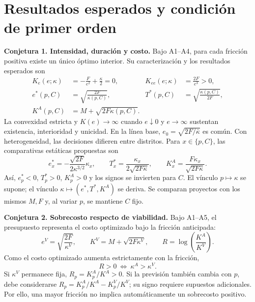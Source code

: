 \documentclass[11pt,a4paper]{article}
\begin{document}
\section{Resultados esperados y condición de primer orden}
\textbf{Conjetura 1. Intensidad, duración y costo.} Bajo A1--A4, para cada fricción positiva existe un único óptimo interior. Su caracterización y los resultados esperados son
\begin{align}
K_e(e;\kappa)&=-\frac{F}{e^2}+\frac{\kappa}{2}=0,
&K_{ee}(e;\kappa)&=\frac{2F}{e^3}>0,\label{eq:foc}\\
e^*(p,C)&=\sqrt{\frac{2F}{\kappa(p,C)}},
&T^*(p,C)&=\sqrt{\frac{\kappa(p,C)}{2F}},\label{eq:optimal}\\
K^A(p,C)&=M+\sqrt{2F\kappa(p,C)}.&&\label{eq:cost}
\end{align}
La convexidad estricta y $K(e)\to\infty$ cuando $e\downarrow0$ y $e\to\infty$ sustentan existencia, interioridad y unicidad. En la línea base, $e_0=\sqrt{2F/\bar\kappa}$ es común. Con heterogeneidad, las decisiones difieren entre distritos. Para $x\in\{p,C\}$, las comparativas estáticas propuestas son
\begin{equation}
e_x^*=-\frac{\sqrt{2F}}{2\kappa^{3/2}}\kappa_x,
\qquad T_x^*=\frac{\kappa_x}{2\sqrt{2F\kappa}},
\qquad K_x^A=\frac{F\kappa_x}{\sqrt{2F\kappa}}.
\label{eq:derivatives}
\end{equation}
Así, $e_p^*<0$, $T_p^*>0$, $K_p^A>0$ y los signos se invierten para $C$. El vínculo $p\mapsto\kappa$ se supone; el vínculo $\kappa\mapsto(e^*,T^*,K^A)$ se deriva. Se comparan proyectos con los mismos $M,F$ y, al variar $p$, se mantiene $C$ fijo.

\textbf{Conjetura 2. Sobrecosto respecto de viabilidad.} Bajo A1--A5, el presupuesto representa el costo optimizado bajo la fricción anticipada:
\begin{equation}
e^V=\sqrt{\frac{2F}{\kappa^V}},\qquad
K^V=M+\sqrt{2F\kappa^V},\qquad
R=\log\!\left(\frac{K^A}{K^V}\right).
\end{equation}
Como el costo optimizado aumenta estrictamente con la fricción,
\begin{equation}
\boxed{R>0\ \Longleftrightarrow\ \kappa^A>\kappa^V.}
\label{eq:overrun}
\end{equation}
Si $\kappa^V$ permanece fija, $R_p=K_p^A/K^A>0$. Si la previsión también cambia con $p$, debe considerarse
$R_p=K_p^A/K^A-K_p^V/K^V$; su signo requiere supuestos adicionales. Por ello, una mayor fricción no implica automáticamente un sobrecosto positivo.
\end{document}
